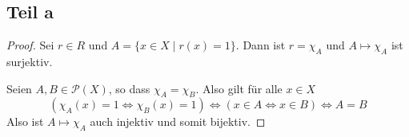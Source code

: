 \documentclass[10pt,a4paper]{article}
\begin{document}
\subsection{Teil a}
\begin{proof}
  Sei $r \in R$ und $A = \{ x \in X \mid r(x) = 1 \}$.
  Dann ist $r = \chi_{A}$ und $A \mapsto \chi_{A}$ ist surjektiv.
  
  Seien $A, B \in \mathscr{P}(X)$, so dass $\chi_{A} = \chi_{B}$.
  Also gilt für alle $x \in X$
  \begin{equation}
    (\chi_{A}(x) = 1 \Leftrightarrow \chi_{B}(x) = 1) \Leftrightarrow (x \in A \Leftrightarrow x \in B) \Leftrightarrow A = B
  \end{equation}
  Also ist $A \mapsto \chi_{A}$ auch injektiv und somit bijektiv.
\end{proof}
\end{document}
